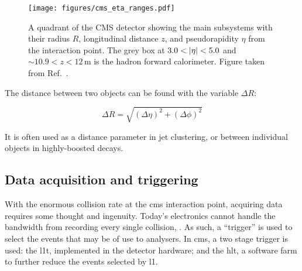 
\begin{figure}[htbp]
    \centering
    \texttt{[image: figures/cms\_eta\_ranges.pdf]}
    \caption[A quadrant of the CMS detector showing the main subsystems with their radius $R$, longitudinal distance $z$, and pseudorapidity $\eta$ from the interaction point]{A quadrant of the CMS detector showing the main subsystems with their radius $R$, longitudinal distance $z$, and pseudorapidity $\eta$ from the interaction point. The grey box at $3.0 < \lvert \eta \rvert < 5.0$ and $\sim 10.9 < z < 12$\,m is the hadron forward calorimeter. Figure taken from Ref.~.}
    \label{fig:cms_eta_bounds}
\end{figure}

The distance between two objects can be found with the variable $\Delta R$:

\begin{equation}
\Delta R = \sqrt{(\Delta \eta)^2 + (\Delta \phi)^2}
\label{eq:delta_r}
\end{equation}

It is often used as a distance parameter in jet clustering, or between individual objects in highly-boosted decays.




\subsection{Data acquisition and triggering}
\label{subsec:cms_recording_data}

With the enormous collision rate at the \acrshort{cms} interaction point, acquiring data requires some thought and ingenuity. Today's electronics cannot handle the bandwidth from recording every single collision, . As such, a ``trigger'' is used to select the events that may be of use to analysers. In \acrshort{cms}, a two stage trigger is used: the \acrfull{l1t}, implemented in the detector hardware; and the \acrfull{hlt}, a software farm to further reduce the events selected by \acrlong{l1}.


